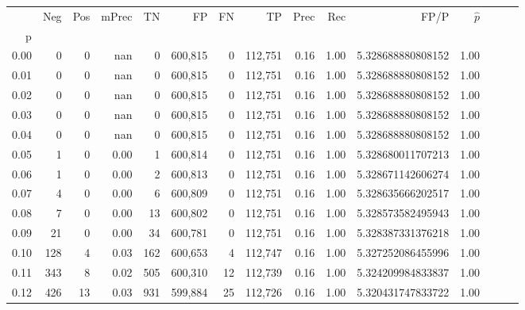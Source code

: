 \begin{tabular}{rrrrrrrrrrrrrrr}
\toprule
{} &     Neg &    Pos & mPrec &       TN &       FP &       FN &       TP &  Prec &   Rec &                    FP/P & $\hat{p}$ \\
p    &         &        &       &          &          &          &          &       &       &                         &           \\
\midrule
0.00 &       0 &      0 &   nan &        0 &  600,815 &        0 &  112,751 &  0.16 &  1.00 &       5.328688880808152 &      1.00 \\
0.01 &       0 &      0 &   nan &        0 &  600,815 &        0 &  112,751 &  0.16 &  1.00 &       5.328688880808152 &      1.00 \\
0.02 &       0 &      0 &   nan &        0 &  600,815 &        0 &  112,751 &  0.16 &  1.00 &       5.328688880808152 &      1.00 \\
0.03 &       0 &      0 &   nan &        0 &  600,815 &        0 &  112,751 &  0.16 &  1.00 &       5.328688880808152 &      1.00 \\
0.04 &       0 &      0 &   nan &        0 &  600,815 &        0 &  112,751 &  0.16 &  1.00 &       5.328688880808152 &      1.00 \\
0.05 &       1 &      0 &  0.00 &        1 &  600,814 &        0 &  112,751 &  0.16 &  1.00 &       5.328680011707213 &      1.00 \\
0.06 &       1 &      0 &  0.00 &        2 &  600,813 &        0 &  112,751 &  0.16 &  1.00 &       5.328671142606274 &      1.00 \\
0.07 &       4 &      0 &  0.00 &        6 &  600,809 &        0 &  112,751 &  0.16 &  1.00 &       5.328635666202517 &      1.00 \\
0.08 &       7 &      0 &  0.00 &       13 &  600,802 &        0 &  112,751 &  0.16 &  1.00 &       5.328573582495943 &      1.00 \\
0.09 &      21 &      0 &  0.00 &       34 &  600,781 &        0 &  112,751 &  0.16 &  1.00 &       5.328387331376218 &      1.00 \\
0.10 &     128 &      4 &  0.03 &      162 &  600,653 &        4 &  112,747 &  0.16 &  1.00 &       5.327252086455996 &      1.00 \\
0.11 &     343 &      8 &  0.02 &      505 &  600,310 &       12 &  112,739 &  0.16 &  1.00 &       5.324209984833837 &      1.00 \\
0.12 &     426 &     13 &  0.03 &      931 &  599,884 &       25 &  112,726 &  0.16 &  1.00 &       5.320431747833722 &      1.00 \\

\end{tabular}
